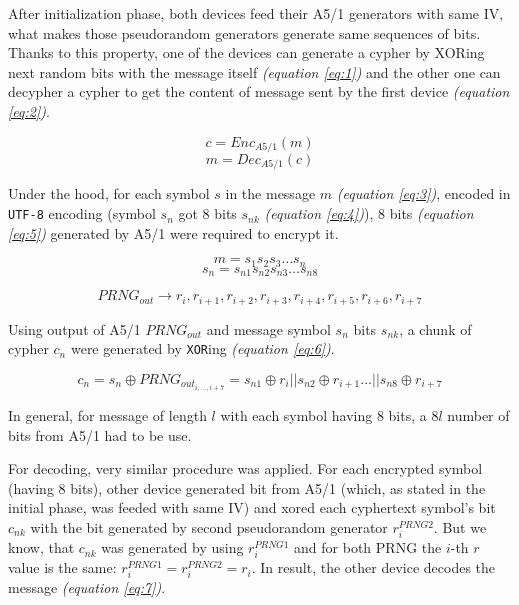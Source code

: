 After initialization phase, both devices feed their A5/1 generators with same IV, what makes those pseudorandom generators generate same sequences of bits. Thanks to this property, one of the devices can generate a cypher by XORing next random bits with the message itself  \textit{(equation \ref{eq:1})} and the other one can decypher a cypher to get the content of message sent by the first device \textit{(equation \ref{eq:2})}.

\begin{equation} \label{eq:1} c = Enc_{A5/1}(m) \end{equation}
\begin{equation} \label{eq:2} m = Dec_{A5/1}(c) \end{equation}

Under the hood, for each symbol $s$ in the message $m$ \textit{(equation \ref{eq:3})}, encoded in \texttt{UTF-8} encoding (symbol $s_n$ got 8 bits $s_{nk}$ \textit{(equation \ref{eq:4})}), 8 bits  \textit{(equation \ref{eq:5})} generated by A5/1 were required to encrypt it.

\begin{equation} \label{eq:3} m = s_1 s_2 s_3 \dots s_n  \end{equation}
\begin{equation} \label{eq:4} s_n = s_{n1} s_{n2} s_{n3} \dots s_{n8}   \end{equation}

\begin{equation} \label{eq:5} PRNG_{out} \rightarrow r_{i}, r_{i+1}, r_{i+2}, r_{i+3}, r_{i+4}, r_{i+5}, r_{i+6}, r_{i+7} \end{equation}

Using output of A5/1 $PRNG_{out}$ and message symbol $s_n$ bits $s_{nk}$, a chunk of cypher $c_n$ were generated by \texttt{XOR}ing \textit{(equation \ref{eq:6})}.

\begin{equation} \label{eq:6} c_n = s_n \oplus PRNG_{out_{i, \dots, i+7}} = s_{n1} \oplus r_{i} || s_{n2} \oplus r_{i+1} \dots || s_{n8} \oplus r_{i+7}\end{equation}

In general, for message of length $l$ with each symbol having $8$ bits,
a $8l$ number of bits from A5/1 had to be use.

For decoding, very similar procedure was applied. For each encrypted symbol (having 8 bits), other device generated bit from A5/1 (which, as stated in the initial phase, was feeded with same IV) and xored each cyphertext symbol's bit $c_{nk}$ with the bit generated by second pseudorandom generator $r_{i}^{PRNG2}$. But we know, that $c_{nk}$ was generated by using ${r_{i}^{PRNG1}}$ and for both PRNG the $i$-th $r$ value is the same: ${r_{i}^{PRNG1}} = r_{i}^{PRNG2} = r_{i}$. In result, the other device decodes the message \textit{(equation \ref{eq:7})}.

